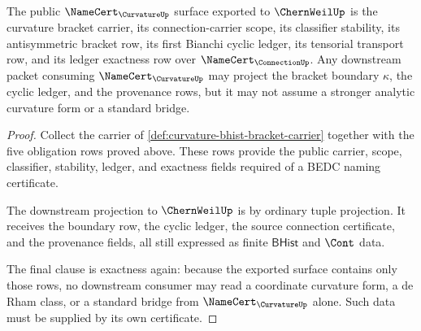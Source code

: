 \begin{theorem}
\label{thm:curvature-namecert-scope-obligation}
The public $\NameCert_{\CurvatureUp}$ surface exported to $\ChernWeilUp$ is the curvature bracket carrier, its connection-carrier scope, its classifier stability, its antisymmetric bracket row, its first Bianchi cyclic ledger, its tensorial transport row, and its ledger exactness row over $\NameCert_{\ConnectionUp}$. Any downstream packet consuming $\NameCert_{\CurvatureUp}$ may project the bracket boundary $\kappa$, the cyclic ledger, and the provenance rows, but it may not assume a stronger analytic curvature form or a standard bridge.
\end{theorem}
\begin{proof}
Collect the carrier of \autoref{def:curvature-bhist-bracket-carrier} together with the five obligation rows proved above. These rows provide the public carrier, scope, classifier, stability, ledger, and exactness fields required of a BEDC naming certificate.

The downstream projection to $\ChernWeilUp$ is by ordinary tuple projection. It receives the boundary row, the cyclic ledger, the source connection certificate, and the provenance fields, all still expressed as finite $\mathsf{BHist}$ and $\Cont$ data.

The final clause is exactness again: because the exported surface contains only those rows, no downstream consumer may read a coordinate curvature form, a de Rham class, or a standard bridge from $\NameCert_{\CurvatureUp}$ alone. Such data must be supplied by its own certificate.
\end{proof}

